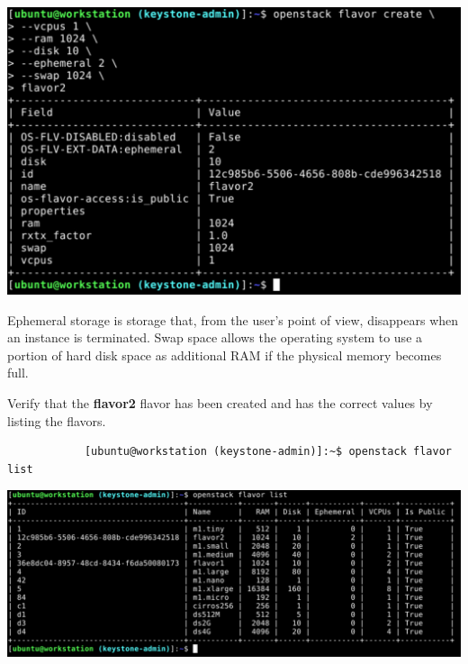 \documentclass[letterpaper, 12pt]{article}
\begin{document}
\begin{enumerate}
\begin{labstep}
        \begin{center}
            \includegraphics[width=\linewidth]{images/part2/step8.png}
        \end{center}
    \end{labstep}

    \begin{notebox}
        Ephemeral storage is storage that, from the user's point of view, disappears when an instance is terminated.
        Swap space allows the operating system to use a portion of hard disk space as additional RAM if the physical memory becomes full.
    \end{notebox}

    \begin{labstep}
        Verify that the \textbf{flavor2} flavor has been created and has the correct values by listing the flavors.
        \begin{lstlisting}
            [ubuntu@workstation (keystone-admin)]:~$ openstack flavor list
        \end{lstlisting}

        \begin{center}
            \includegraphics[width=\linewidth]{images/part2/step9.png}
        \end{center}
    \end{labstep}


\end{enumerate}
\end{document}
